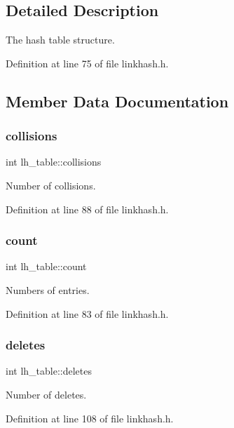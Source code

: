 \subsection{Detailed Description}
The hash table structure. 

Definition at line 75 of file linkhash.\+h.



\subsection{Member Data Documentation}
\mbox{\label{structlh__table_a9458e41d842ce40cd37dc13458ced133}} 
\subsubsection{\texorpdfstring{collisions}{collisions}}
{\footnotesize\ttfamily int lh\+\_\+table\+::collisions}

Number of collisions. 

Definition at line 88 of file linkhash.\+h.

\mbox{\label{structlh__table_aa172ed8fe205367b54e0e2cdf9ea8c6c}} 
\subsubsection{\texorpdfstring{count}{count}}
{\footnotesize\ttfamily int lh\+\_\+table\+::count}

Numbers of entries. 

Definition at line 83 of file linkhash.\+h.

\mbox{\label{structlh__table_a8348bdd7e61c8d72b402f6a152013fbf}} 
\subsubsection{\texorpdfstring{deletes}{deletes}}
{\footnotesize\ttfamily int lh\+\_\+table\+::deletes}

Number of deletes. 

Definition at line 108 of file linkhash.\+h.


